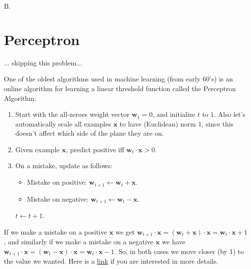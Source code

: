\documentclass{article}
\newcommand{\1}{\mathbf{1}}
\newcommand{\bx}{\mathbf x}
\newcommand{\bw}{\mathbf w}
\newcounter{bprob}
\newenvironment{bprob}[1][]{\begin{mdframed} \refstepcounter{bprob}\par\medskip
  B\thebprob.#1 }
   { \end{mdframed} }
\begin{document}
\newpage


\begin{bprob}
\section*{Perceptron}
\Huge{... skipping this problem...}
\normalsize

One of the oldest algorithms used in machine learning (from early 60's) is an online algorithm for learning a linear threshold function called the Perceptron Algorithm:

\begin{enumerate}[label=\arabic*.]
\item Start with the all-zeroes weight vector $\bw_1 = 0$, and initialize $t$ to $1$. Also let's automatically scale all examples $\bx$ to have (Euclidean) norm $1$, since this doesn't affect which side of the plane they are on.

\item Given example $\bx$, predict positive iff $\bw_t \cdot \bx > 0$.

\item On a mistake, update as follows:
\begin{itemize}
    \item Mistake on positive: $\bw_{t+1} \leftarrow \bw_t + \bx$. 
    \item Mistake on negative: $\bw_{t+1} \leftarrow \bw_t - \bx$.
\end{itemize}
    $t \leftarrow t + 1$.
\end{enumerate}
If we make a mistake on a positive $\bx$ we get $\bw_{t + 1} \cdot \bx = (\bw_{t} + \bx) \cdot \bx = \bw_{t} \cdot \bx + 1$, and similarly if we make a mistake on a negative $\bx$ we have $\bw_{t + 1} \cdot \bx = (\bw_{t} - \bx) \cdot \bx = \bw_{t} \cdot \bx - 1$. So, in both cases we move closer (by 1) to the value we wanted. Here is a \href{https://en.wikipedia.org/wiki/Perceptron}{link} if you are interested in more details.\\


\end{bprob}
\end{document}
